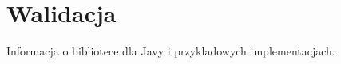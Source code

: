 \chapter{Walidacja}
\label{cha:walidacja}

Informacja o bibliotece dla Javy i przykladowych implementacjach.
